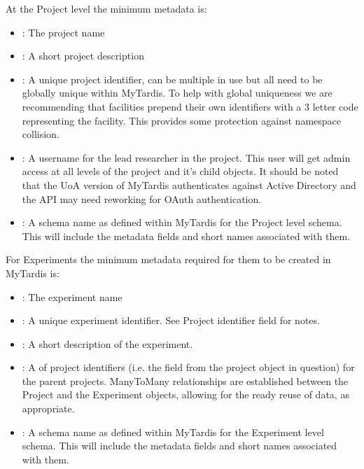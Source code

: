 \documentclass[letterpaper,10pt,english]{sphinxmanual}
\begin{document}
\sphinxAtStartPar
At the Project level the minimum metadata is:
\begin{itemize}
\item {}
\sphinxAtStartPar
{}: The project name

\item {}
\sphinxAtStartPar
{}: A short project description

\item {}
\sphinxAtStartPar
{}: A unique project identifier, can be multiple in use but all need to be globally unique within MyTardis. To help with global uniqueness we are recommending that facilities prepend their own identifiers with a 3 letter code representing the facility. This provides some protection against namespace collision.

\item {}
\sphinxAtStartPar
{}: A username for the lead researcher in the project. This user will get admin access at all levels of the project and it’s child objects. It should be noted that the UoA version of MyTardis authenticates against Active Directory and the API may need reworking for OAuth authentication.

\item {}
\sphinxAtStartPar
{}: A schema name as defined within MyTardis for the Project level schema. This will include the metadata fields and short names associated with them.

\end{itemize}

\sphinxAtStartPar
For Experiments the minimum metadata required for them to be created in MyTardis is:
\begin{itemize}
\item {}
\sphinxAtStartPar
{}: The experiment name

\item {}
\sphinxAtStartPar
{}: A unique experiment identifier. See Project identifier field for notes.

\item {}
\sphinxAtStartPar
{}: A short description of the experiment.

\item {}
\sphinxAtStartPar
{}: A  of project identifiers (i.e. the  field from the project object in question) for the parent projects.  Many\sphinxhyphen{}To\sphinxhyphen{}Many relationships are established between the Project and the Experiment objects, allowing for the ready re\sphinxhyphen{}use of data, as appropriate.

\item {}
\sphinxAtStartPar
{}: A schema name as defined within MyTardis for the Experiment level schema. This will include the metadata fields and short names associated with them.

\end{itemize}
\end{document}
